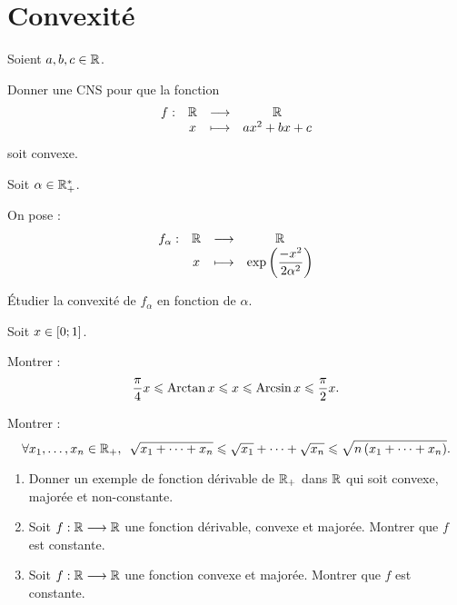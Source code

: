 \begin{corr}
\end{corr}

\section{Convexité}

\begin{exo}[Exercice 13]
Soient \(a,b,c\in\mathbb{R}\).

Donner une CNS pour que la fonction \[\begin{array}[t]{cccc}f : & \mathbb{R} & \longrightarrow & \mathbb{R} \\ & x & \longmapsto & ax^2+bx+c\end{array}\] soit convexe.
\end{exo}

\begin{corr}
\end{corr}

\begin{exo}[Exercice 14]
Soit \(\alpha\in\mathbb{R}_+^*\).

On pose : \[\begin{array}[t]{cccc}f_\alpha : & \mathbb{R} & \longrightarrow & \mathbb{R} \\ & x & \longmapsto & \exp\left(\dfrac{-x^2}{2\alpha^2}\right)\end{array}\]

Étudier la convexité de \(f_\alpha\) en fonction de \(\alpha\).
\end{exo}

\begin{corr}
\end{corr}

\begin{exo}[Exercice 15]
Soit \(x\in\left[0;1\right]\).

Montrer : \[\dfrac{\pi}{4}x\leqslant\operatorname{Arctan} x\leqslant x\leqslant\operatorname{Arcsin} x\leqslant\dfrac{\pi}{2}x.\]
\end{exo}

\begin{corr}
\end{corr}

\begin{exo}[Exercice 16]
Montrer : \[\quantifs{\forall x_1,\dots,x_n\in\Rp}\sqrt{x_1+\dots+x_n}\leq\sqrt{x_1}+\dots+\sqrt{x_n}\leq\sqrt{n\paren{x_1+\dots+x_n}}.\]
\end{exo}

\begin{corr}
\end{corr}

\begin{exo}[Exercice 17]
\begin{enumerate}
\item Donner un exemple de fonction dérivable de \(\mathbb{R}_+\) dans \(\mathbb{R}\) qui soit convexe, majorée et non-constante. \\

\item Soit \(f:\mathbb{R}\longrightarrow\mathbb{R}\) une fonction dérivable, convexe et majorée. Montrer que \(f\) est constante. \\

\item Soit \(f:\mathbb{R}\longrightarrow\mathbb{R}\) une fonction convexe et majorée. Montrer que \(f\) est constante.
\end{enumerate}
\end{exo}

